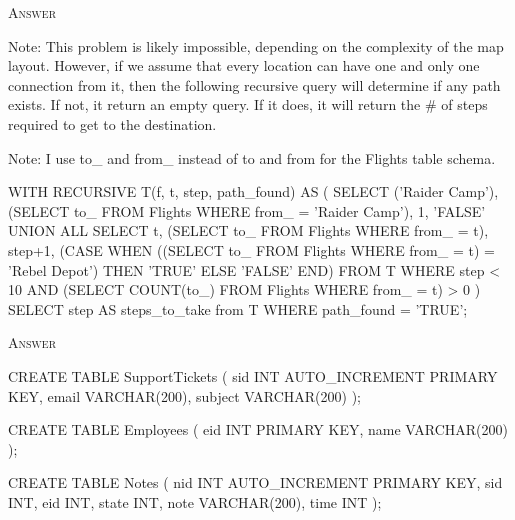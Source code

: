 \textsc{Answer}
\begin{answercode}
Note: This problem is likely impossible, depending on the complexity
of the map layout. However, if we assume that every location can
have one and only one connection from it, then the following
recursive query will determine if any path exists. If not, it return
an empty query. If it does, it will return the # of steps required
to get to the destination.

Note: I use to_ and from_ instead of to and from for the Flights
table schema.

WITH RECURSIVE T(f, t, step, path_found)
AS (
	 SELECT ('Raider Camp'), (SELECT to_ FROM Flights WHERE
          from_ = 'Raider Camp'), 1, 'FALSE'
	 UNION ALL
	 SELECT t,
   (SELECT to_ FROM Flights WHERE from_ = t),
   step+1,
   (CASE WHEN ((SELECT to_ FROM Flights WHERE
   from_ = t) = 'Rebel Depot') THEN 'TRUE' ELSE 'FALSE' END)
   FROM T WHERE step < 10 AND (SELECT COUNT(to_)
   FROM Flights WHERE from_ = t) > 0
) SELECT step AS steps_to_take from T WHERE path_found = 'TRUE';
\end{answercode}




\newpage



\newpage


\textsc{Answer}
\begin{answercode}
CREATE TABLE SupportTickets (
			 sid INT AUTO_INCREMENT PRIMARY KEY,
			 email VARCHAR(200),
			 subject VARCHAR(200)
);

CREATE TABLE Employees (
			 eid INT PRIMARY KEY,
			 name VARCHAR(200)
);

CREATE TABLE Notes (
			 nid INT AUTO_INCREMENT PRIMARY KEY,
			 sid INT,
			 eid INT,
			 state INT,
			 note VARCHAR(200),
			 time INT
);
\end{answercode}




\newpage


